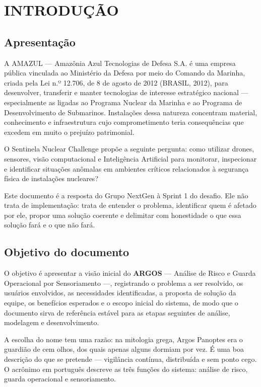 \documentclass[12pt,a4paper,oneside]{article}
\begin{document}
\section{INTRODUÇÃO}

\subsection{Apresentação}

A AMAZUL — Amazônia Azul Tecnologias de Defesa S.A. é uma empresa pública
vinculada ao Ministério da Defesa por meio do Comando da Marinha, criada pela
Lei n.º 12.706, de 8 de agosto de 2012 (BRASIL, 2012), para desenvolver,
transferir e manter tecnologias de interesse estratégico nacional —
especialmente as ligadas ao Programa Nuclear da Marinha e ao Programa de
Desenvolvimento de Submarinos. Instalações dessa natureza concentram material,
conhecimento e infraestrutura cujo comprometimento teria consequências que
excedem em muito o prejuízo patrimonial.

O Sentinela Nuclear Challenge propõe a seguinte pergunta: como utilizar drones,
sensores, visão computacional e Inteligência Artificial para monitorar,
inspecionar e identificar situações anômalas em ambientes críticos relacionados
à segurança física de instalações nucleares?

Este documento é a resposta do Grupo NextGen à Sprint 1 do desafio. Ele não
trata de implementação: trata de entender o problema, identificar quem é
afetado por ele, propor uma solução coerente e delimitar com honestidade o que
essa solução fará e o que não fará.

\subsection{Objetivo do documento}

O objetivo é apresentar a visão inicial do \textbf{ARGOS} — Análise de Risco e
Guarda Operacional por Sensoriamento —, registrando o problema a ser resolvido,
os usuários envolvidos, as necessidades identificadas, a proposta de solução da
equipe, os benefícios esperados e o escopo inicial do sistema, de modo que o
documento sirva de referência estável para as etapas seguintes de análise,
modelagem e desenvolvimento.

A escolha do nome tem uma razão: na mitologia grega, Argos Panoptes era o
guardião de cem olhos, dos quais apenas alguns dormiam por vez. É uma boa
descrição do que se pretende — vigilância contínua, distribuída e sem ponto
cego. O acrônimo em português descreve as três funções do sistema: análise de
risco, guarda operacional e sensoriamento.
\end{document}

